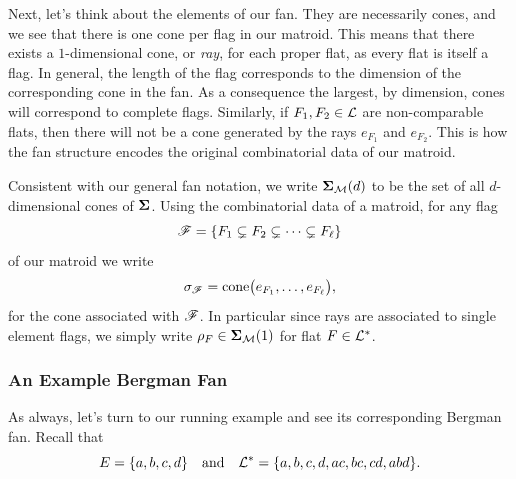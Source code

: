 \documentclass[12pt,oneside]{../../sfsuthesis}
\begin{document}
Next, let's think about the elements of our fan.
They are necessarily cones, and we see that there is one cone per flag in our matroid.
This means that there exists a \( 1 \)-dimensional cone, or \textit{ray}, for each proper flat, as every flat is itself a flag.
In general, the length of the flag corresponds to the dimension of the corresponding cone in the fan.
As a consequence the largest, by dimension, cones will correspond to complete flags.
Similarly, if \( F_1, F_2 \in \mathcal{L} \) are non-comparable flats, then there will not be a cone generated by the rays \( e_{F_1} \) and \( e_{F_2} \).
This is how the fan structure encodes the original combinatorial data of our matroid.

Consistent with our general fan notation, we write \( {\bm{\Sigma}}_{\mathcal{M}}(d) \) to be the set of all \( d \)-dimensional cones of \( {\bm{\Sigma}} \).
Using the combinatorial data of a matroid, for any flag
\[
    \mathscr{F} = \{ F_1 \subsetneq F_2 \subsetneq \cdots \subsetneq F_\ell \}
\]
of our matroid we write
\[
    \sigma_{\mathscr{F}} = \mathrm{cone}\bigl( e_{F_1}, \dots, e_{F_\ell} \bigr),
\]
for the cone associated with \(\mathscr{F}\).
In particular since rays are associated to single element flags, we simply write \( \rho_F \in {\bm{\Sigma}}_{\mathcal{M}}(1) \) for flat \( F \in \mathcal{L}^\ast \).

\subsubsection{An Example Bergman Fan}
As always, let's turn to our running example and see its corresponding Bergman fan.
Recall that
\[
    E = \{ a, b, c, d \} \quad \text{and} \quad \mathcal{L}^\ast = \{ a, b, c, d, ac, bc, cd, abd \}.
\]
\end{document}
